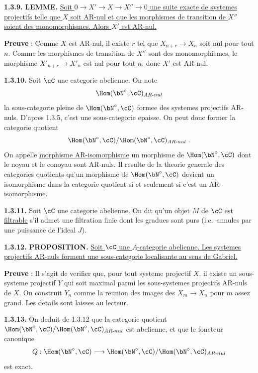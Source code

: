 \medskip
\noindent\textbf{1.3.9.} \textbf{LEMME.} \underline{Soit $0 \longrightarrow X' \longrightarrow X \longrightarrow X'' \longrightarrow 0$ une suite exacte de systemes projectifs telle que $X$ soit AR-nul et que les morphismes de transition de $X''$ soient des monomorphismes. Alors $X'$ est AR-nul.}

\textbf{Preuve} : Comme $X$ est AR-nul, il existe $r$ tel que $X_{n+r} \longrightarrow X_n$ soit nul pour tout $n$. Comme les morphismes de transition de $X''$ sont des monomorphismes, le morphisme $X'_{n+r} \longrightarrow X'_n$ est nul pour tout $n$, donc $X'$ est AR-nul.

\medskip
\noindent\textbf{1.3.10.} Soit $\cC$ une categorie abelienne. On note
\[
\Hom(\bN^\circ, \cC)_{AR\text{-}nul}
\]
la sous-categorie pleine de $\Hom(\bN^\circ, \cC)$ formee des systemes projectifs AR-nuls. D'apres 1.3.5, c'est une sous-categorie epaisse. On peut donc former la categorie quotient
\[
\Hom(\bN^\circ, \cC) / \Hom(\bN^\circ, \cC)_{AR\text{-}nul}\;.
\]
On appelle \underline{morphisme AR-isomorphisme} un morphisme de $\Hom(\bN^\circ, \cC)$ dont le noyau et le conoyau sont AR-nuls. Il resulte de la theorie generale des categories quotients qu'un morphisme de $\Hom(\bN^\circ, \cC)$ devient un isomorphisme dans la categorie quotient si et seulement si c'est un AR-isomorphisme.

\medskip
\noindent\textbf{1.3.11.} Soit $\cC$ une categorie abelienne. On dit qu'un objet $M$ de $\cC$ est \underline{filtrable} s'il admet une filtration finie dont les gradues sont purs (i.e.\ annules par une puissance de l'ideal $J$).

\medskip
\noindent\textbf{1.3.12.} \textbf{PROPOSITION.} \underline{Soit $\cC$ une $A$-categorie abelienne. Les systemes projectifs AR-nuls forment une sous-categorie localisante au sens de Gabriel.}

\textbf{Preuve} : Il s'agit de verifier que, pour tout systeme projectif $X$, il existe un sous-systeme projectif $Y$ qui soit maximal parmi les sous-systemes projectifs AR-nuls de $X$. On construit $Y_n$ comme la reunion des images des $X_m \longrightarrow X_n$ pour $m$ assez grand. Les details sont laisses au lecteur.

\medskip
\noindent\textbf{1.3.13.} On deduit de 1.3.12 que la categorie quotient $\Hom(\bN^\circ, \cC) / \Hom(\bN^\circ, \cC)_{AR\text{-}nul}$ est abelienne, et que le foncteur canonique
\[
Q : \Hom(\bN^\circ, \cC) \longrightarrow \Hom(\bN^\circ, \cC) / \Hom(\bN^\circ, \cC)_{AR\text{-}nul}
\]
est exact.

